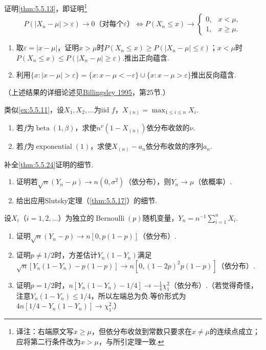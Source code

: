 \begin{exercise}\label{exercise:5.41}
证明\autoref{thm:5.5.13}，即证明\footnote{译注：右端原文写$x\ge\mu$，但依分布收敛到常数只要求在$x\ne\mu$的连续点成立；应将第二行条件改为$x>\mu$，与所引定理一致.}
$$P(|X_n-\mu|>\varepsilon)\to0\text{（对每个$\varepsilon$）}\iff P(X_n\le x)\to\begin{cases}0,&x<\mu,\\1,&x\ge\mu.\end{cases}$$

\begin{enumerate}[label=(\alph*)]
\item 取$\varepsilon=|x-\mu|$，证明$x>\mu$时$P(X_n\le x)\ge P(|X_n-\mu|\le\varepsilon)$；$x<\mu$时$P(X_n\le x)\le P(|X_n-\mu|\ge\varepsilon)$.推出正向蕴含.
\item 利用$\{x:|x-\mu|>\varepsilon\}=\{x:x-\mu<-\varepsilon\}\cup\{x:x-\mu>\varepsilon\}$推出反向蕴含.
\end{enumerate}
（上述结果的详细论述见\hyperref[bib:source33]{Billingsley 1995}，第25节.）
\end{exercise}
\begin{exercise}\label{exercise:5.42}
类似\autoref{ex:5.5.11}，设$X_1,X_2,\ldots$为iid $f$，$X_{(n)}=\max_{1\le i\le n}X_i$.
\begin{enumerate}[label=(\alph*)]\item 若$f$为$\operatorname{beta}(1,\beta)$，求使$n^\nu(1-X_{(n)})$依分布收敛的$\nu$.\item 若$f$为$\operatorname{exponential}(1)$，求使$X_{(n)}-a_n$依分布收敛的序列$a_n$.\end{enumerate}
\end{exercise}
\begin{exercise}\label{exercise:5.43}
补全\autoref{thm:5.5.24}证明的细节.
\begin{enumerate}[label=(\alph*)]\item 证明若$\sqrt n(Y_n-\mu)\to n(0,\sigma^2)$（依分布），则$Y_n\to\mu$（依概率）.\item 给出应用Slutsky定理（\autoref{thm:5.5.17}）的细节.\end{enumerate}
\end{exercise}
\begin{exercise}\label{exercise:5.44}
设$X_i$（$i=1,2,\ldots$）为独立的$\operatorname{Bernoulli}(p)$随机变量，$Y_n=n^{-1}\sum_{i=1}^nX_i$.
\begin{enumerate}[label=(\alph*)]
\item 证明$\sqrt n(Y_n-p)\to n[0,p(1-p)]$（依分布）.
\item 证明$p\ne1/2$时，方差估计$Y_n(1-Y_n)$满足$\sqrt n[Y_n(1-Y_n)-p(1-p)]\to n[0,(1-2p)^2p(1-p)]$（依分布）.
\item 证明$p=1/2$时，$n[Y_n(1-Y_n)-1/4]\to-\frac14\chi_1^2$（依分布）.（若觉得奇怪，注意$Y_n(1-Y_n)\le1/4$，所以左端总为负.等价形式为$4n[1/4-Y_n(1-Y_n)]\to\chi_1^2$.）
\end{enumerate}
\end{exercise}
